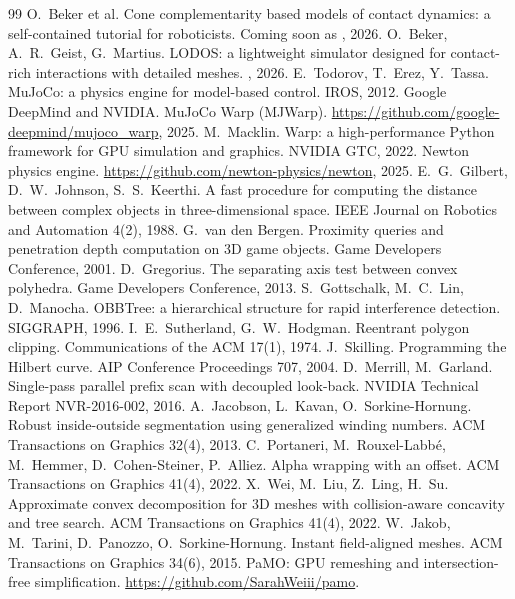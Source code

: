 \begin{thebibliography}{99}
 O.~Beker et al. Cone complementarity based models of contact dynamics: a self-contained tutorial for roboticists. Coming soon as , 2026.
 O.~Beker, A.~R.~Geist, G.~Martius. LODOS: a lightweight simulator designed for contact-rich interactions with detailed meshes. , 2026.
 E.~Todorov, T.~Erez, Y.~Tassa. MuJoCo: a physics engine for model-based control. IROS, 2012.
 Google DeepMind and NVIDIA. MuJoCo Warp (MJWarp). \url{https://github.com/google-deepmind/mujoco_warp}, 2025.
 M.~Macklin. Warp: a high-performance Python framework for GPU simulation and graphics. NVIDIA GTC, 2022.
 Newton physics engine. \url{https://github.com/newton-physics/newton}, 2025.
 E.~G.~Gilbert, D.~W.~Johnson, S.~S.~Keerthi. A fast procedure for computing the distance between complex objects in three-dimensional space. IEEE Journal on Robotics and Automation 4(2), 1988.
 G.~van den Bergen. Proximity queries and penetration depth computation on 3D game objects. Game Developers Conference, 2001.
 D.~Gregorius. The separating axis test between convex polyhedra. Game Developers Conference, 2013.
 S.~Gottschalk, M.~C.~Lin, D.~Manocha. OBBTree: a hierarchical structure for rapid interference detection. SIGGRAPH, 1996.
 I.~E.~Sutherland, G.~W.~Hodgman. Reentrant polygon clipping. Communications of the ACM 17(1), 1974.
 J.~Skilling. Programming the Hilbert curve. AIP Conference Proceedings 707, 2004.
 D.~Merrill, M.~Garland. Single-pass parallel prefix scan with decoupled look-back. NVIDIA Technical Report NVR-2016-002, 2016.
 A.~Jacobson, L.~Kavan, O.~Sorkine-Hornung. Robust inside-outside segmentation using generalized winding numbers. ACM Transactions on Graphics 32(4), 2013.
 C.~Portaneri, M.~Rouxel-Labb\'e, M.~Hemmer, D.~Cohen-Steiner, P.~Alliez. Alpha wrapping with an offset. ACM Transactions on Graphics 41(4), 2022.
 X.~Wei, M.~Liu, Z.~Ling, H.~Su. Approximate convex decomposition for 3D meshes with collision-aware concavity and tree search. ACM Transactions on Graphics 41(4), 2022.
 W.~Jakob, M.~Tarini, D.~Panozzo, O.~Sorkine-Hornung. Instant field-aligned meshes. ACM Transactions on Graphics 34(6), 2015.
 PaMO: GPU remeshing and intersection-free simplification. \url{https://github.com/SarahWeiii/pamo}.
\end{thebibliography}


